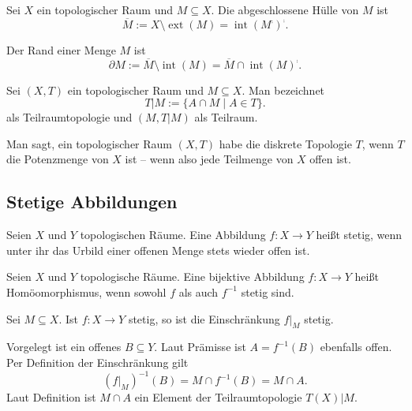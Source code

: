 \begin{Definition}\newlinefirst
Sei $X$ ein topologischer Raum und $M\subseteq X$. Die abgeschlossene Hülle von $M$ ist%
\[\overline M := X\setminus\operatorname{ext}(M) = \operatorname{int}(M^\comp)^\comp.\]
\end{Definition}

\begin{Definition}[Rand]
Der Rand einer Menge $M$ ist
\[\partial M := \overline M\setminus\operatorname{int}(M)
= \overline M\cap\operatorname{int}(M)^\comp.\]
\end{Definition}

\begin{Definition}[Teilraumtopologie]%
\newlinefirst
Sei $(X,T)$ ein topologischer Raum und $M\subseteq X$. Man bezeichnet
\[T|M := \{A\cap M\mid A\in T\}.\]
als Teilraumtopologie und $(M,T|M)$ als Teilraum.
\end{Definition}

\begin{Definition}%
\newlinefirst
Man sagt, ein topologischer Raum $(X,T)$ habe die diskrete Topologie $T$,
wenn $T$ die Potenzmenge von $X$ ist -- wenn also jede Teilmenge
von $X$ offen ist.
\end{Definition}

\subsection{Stetige Abbildungen}

\begin{Definition}%
\label{def:cont}\newlinefirst
Seien $X$ und $Y$ topologischen Räume. Eine Abbildung $f\colon X\to Y$
heißt stetig, wenn unter ihr das Urbild einer offenen Menge stets
wieder offen ist.
\end{Definition}

\begin{Definition}[Homöomorphismus]%
\newlinefirst
Seien $X$ und $Y$ topologische Räume. Eine bijektive Abbildung
$f\colon X\to Y$ heißt Homöomorphismus, wenn sowohl $f$ als auch
$f^{-1}$ stetig sind.
\end{Definition}

\begin{Satz}
Sei $M\subseteq X$. Ist $f\colon X\to Y$ stetig, so ist
die Einschränkung $f|_M$ stetig.
\end{Satz}
\begin{Beweis}
Vorgelegt ist ein offenes $B\subseteq Y$. Laut Prämisse ist $A=f^{-1}(B)$
ebenfalls offen. Per Definition der Einschränkung gilt
\[(f|_M)^{-1}(B) = M\cap f^{-1}(B) = M\cap A.\]
Laut Definition ist $M\cap A$ ein Element der Teilraumtopologie $T(X)|M$.\,\qedsymbol
\end{Beweis}

